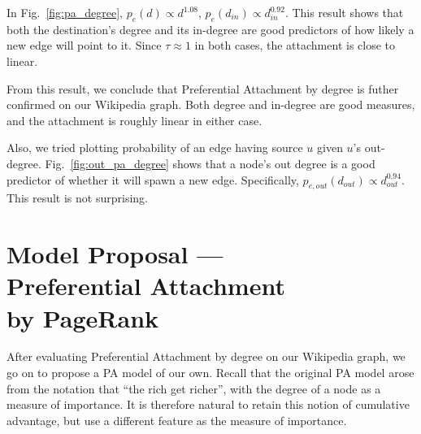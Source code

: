 \documentclass[10pt,twocolumn]{article}
\begin{document}
In Fig.~\ref{fig:pa_degree}, $p_e(d)\propto d^{1.08}$, $p_e(d_{in})\propto d_{in}^{0.92}$. This result shows that both the destination's degree and its in-degree are good predictors of how likely a new edge will point to it. Since $\tau \approx 1$ in both cases, the attachment is close to linear.

From this result, we conclude that Preferential Attachment by degree is futher confirmed on our Wikipedia graph. Both degree and in-degree are good measures, and the attachment is roughly linear in either case.

Also, we tried plotting probability of an edge having source $u$ given $u$'s out-degree. Fig.~\ref{fig:out_pa_degree} shows that a node's out degree is a good predictor of whether it will spawn a new edge. Specifically, $p_{e,out}(d_{out})\propto d_{out}^{0.94}$. This result is not surprising.
\begin{figure}[ht]
\end{figure}

\section{Model Proposal ---\\
  Preferential Attachment \\
  by PageRank}

After evaluating Preferential Attachment by degree on our Wikipedia graph, we go on to propose a PA model of our own. Recall that the original PA model arose from the notation that ``the rich get richer'', with the degree of a node as a measure of importance. It is therefore natural to retain this notion of cumulative advantage, but use a different feature as the measure of importance.
\end{document}
